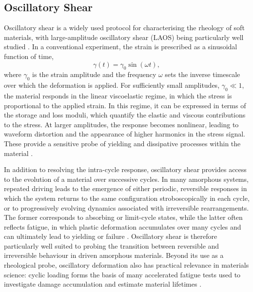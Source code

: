 \subsection{Oscillatory Shear} \label{sec:lAOS}

Oscillatory shear is a widely used protocol for characterising the rheology of soft materials, with large-amplitude oscillatory shear (LAOS) being particularly well studied \cite{rouyerLargeAmplitudeOscillatory2008a,yoshimuraResponseElasticBingham1987a,viasnoffHowAreColloidal2003,carterShearBandingPolymeric,ewoldtLargeAmplitudeOscillatory2010,renouYieldingProcessesColloidal2010}. In a conventional experiment, the strain is prescribed as a sinusoidal function of time,
\[
    \gamma(t) = \gamma_0 \sin(\omega t),
\]
where $\gamma_0$ is the strain amplitude and the frequency $\omega$ sets the inverse timescale over which the deformation is applied. For sufficiently small amplitudes, $\gamma_0 \ll 1$, the material responds in the linear viscoelastic regime, in which the stress is proportional to the applied strain. In this regime, it can be expressed in terms of the storage and loss moduli, which quantify the elastic and viscous contributions to the stress. At larger amplitudes, the response becomes nonlinear, leading to waveform distortion and the appearance of higher harmonics in the stress signal. These provide a sensitive probe of yielding and dissipative processes within the material \cite{ewoldtLargeAmplitudeOscillatory2010}.

In addition to resolving the intra-cycle response, oscillatory shear provides access to the evolution of a material over successive cycles. In many amorphous systems, repeated driving leads to the emergence of either periodic, reversible responses in which the system returns to the same configuration stroboscopically in each cycle, or to progressively evolving dynamics associated with irreversible rearrangements. The former corresponds to absorbing or limit-cycle states, while the latter often reflects fatigue, in which plastic deformation accumulates over many cycles and can ultimately lead to yielding or failure \cite{liuFateShearoscillatedAmorphous2022,Leishangthem2017,Fiocco_memory_2014,Regev_onset_2013}. Oscillatory shear is therefore particularly well suited to probing the transition between reversible and irreversible behaviour in driven amorphous materials. Beyond its use as a rheological probe, oscillatory deformation also has practical relevance in materials science: cyclic loading forms the basis of many accelerated fatigue tests used to investigate damage accumulation and estimate material lifetimes \cite{Suresh1998,DowlingMechanical2013}.

